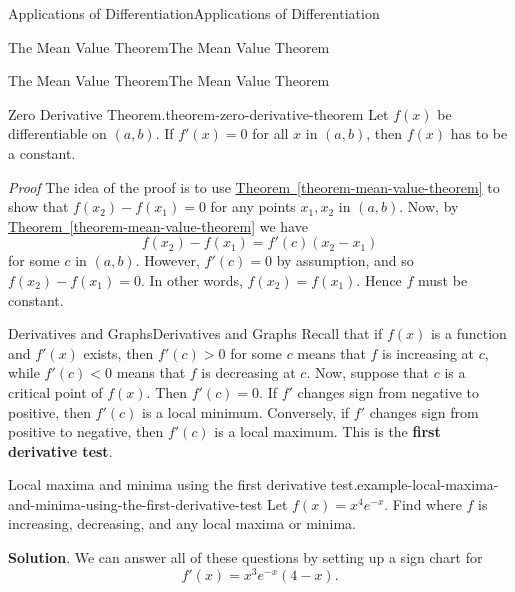 \documentclass[10pt,]{book}
\makeatletter
\newcommand{\terminology}[1]{\textbf{#1}}
\renewcommand*{\proofname}{Proof}
\renewenvironment{proof}[1][\proofname]{\par
  \pushQED{\qed}%
  \normalfont \topsep6\p@\@plus6\p@\relax
  \trivlist
  \item\relax
    {\itshape
    #1\@addpunct{.}}\hspace\labelsep\ignorespaces
}{%
  \popQED\endtrivlist\@endpefalse
}
\numberwithin{equation}{section}
\makeatother
\begin{document}
\begin{chapterptx}{Applications of Differentiation}{}{Applications of Differentiation}{}{}
\begin{sectionptx}{The Mean Value Theorem}{}{The Mean Value Theorem}{}{}
\begin{subsectionptx}{The Mean Value Theorem}{}{The Mean Value Theorem}{}{}
\begin{theorem}{Zero Derivative Theorem.}{}{theorem-zero-derivative-theorem}
\hypertarget{p-344}{}%
Let \(f(x)\) be differentiable on \((a,b)\). If \(f'(x) = 0\) for all \(x\) in \((a,b)\), then \(f(x)\) has to be a constant.%
\end{theorem}
\begin{proof}\hypertarget{proof-8}{}
\hypertarget{p-345}{}%
The idea of the proof is to use \hyperref[theorem-mean-value-theorem]{Theorem~\ref{theorem-mean-value-theorem}} to show that \(f(x_{2}) - f(x_{1}) = 0\) for any points \(x_{1},x_{2}\) in \((a,b)\). Now, by \hyperref[theorem-mean-value-theorem]{Theorem~\ref{theorem-mean-value-theorem}} we have%
\begin{equation*}
f(x_{2}) - f(x_{1}) = f'(c)(x_{2}-x_{1})
\end{equation*}
for some \(c\) in \((a,b)\). However, \(f'(c) = 0\) by assumption, and so \(f(x_{2}) - f(x_{1}) = 0\). In other words, \(f(x_{2}) = f(x_{1})\). Hence \(f\) must be constant.%
\end{proof}
\end{subsectionptx}
\end{sectionptx}
%
%
\typeout{************************************************}
\typeout{************************************************}
%
\begin{sectionptx}{Derivatives and Graphs}{}{Derivatives and Graphs}{}{}\label{section-derivatives-and-graphs}
\hypertarget{p-346}{}%
Recall that if \(f(x)\) is a function and \(f'(x)\) exists, then \(f'(c) > 0\) for some \(c\) means that \(f\) is increasing at \(c\), while \(f'(c) < 0\) means that \(f\) is decreasing at \(c\). Now, suppose that \(c\) is a critical point of \(f(x)\). Then \(f'(c) = 0\). If \(f'\) changes sign from negative to positive, then \(f'(c)\) is a local minimum. Conversely, if \(f'\) changes sign from positive to negative, then \(f'(c)\) is a local maximum. This is the \terminology{first derivative test}.%
\begin{example}{Local maxima and minima using the first derivative test.}{example-local-maxima-and-minima-using-the-first-derivative-test}%
\hypertarget{p-347}{}%
Let \(f(x) = x^{4}e^{-x}\). Find where \(f\) is increasing, decreasing, and any local maxima or minima.%
\par\smallskip%
\noindent\textbf{Solution}.\hypertarget{solution-75}{}\quad%
\hypertarget{p-348}{}%
We can answer all of these questions by setting up a sign chart for%
\begin{equation*}
f'(x) = x^{3}e^{-x}(4-x)\text{.}
\end{equation*}

\end{example}
\end{sectionptx}
\end{chapterptx}
\end{document}
